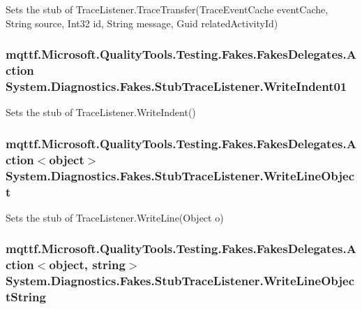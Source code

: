Sets the stub of Trace\-Listener.\-Trace\-Transfer(\-Trace\-Event\-Cache event\-Cache, String source, Int32 id, String message, Guid related\-Activity\-Id)

\hypertarget{class_system_1_1_diagnostics_1_1_fakes_1_1_stub_trace_listener_aa9d5761767a2ecc60a3db129716130dd}{
\subsubsection[{Write\-Indent01}]{\setlength{\rightskip}{0pt plus 5cm}mqttf.\-Microsoft.\-Quality\-Tools.\-Testing.\-Fakes.\-Fakes\-Delegates.\-Action System.\-Diagnostics.\-Fakes.\-Stub\-Trace\-Listener.\-Write\-Indent01}}\label{class_system_1_1_diagnostics_1_1_fakes_1_1_stub_trace_listener_aa9d5761767a2ecc60a3db129716130dd}


Sets the stub of Trace\-Listener.\-Write\-Indent()

\hypertarget{class_system_1_1_diagnostics_1_1_fakes_1_1_stub_trace_listener_a69bf38a6fcd21de1b4cc9af632e6d5ff}{
\subsubsection[{Write\-Line\-Object}]{\setlength{\rightskip}{0pt plus 5cm}mqttf.\-Microsoft.\-Quality\-Tools.\-Testing.\-Fakes.\-Fakes\-Delegates.\-Action$<$object$>$ System.\-Diagnostics.\-Fakes.\-Stub\-Trace\-Listener.\-Write\-Line\-Object}}\label{class_system_1_1_diagnostics_1_1_fakes_1_1_stub_trace_listener_a69bf38a6fcd21de1b4cc9af632e6d5ff}


Sets the stub of Trace\-Listener.\-Write\-Line(\-Object o)

\hypertarget{class_system_1_1_diagnostics_1_1_fakes_1_1_stub_trace_listener_a155261d1acef8b8b5f24e3be80c1d46a}{
\subsubsection[{Write\-Line\-Object\-String}]{\setlength{\rightskip}{0pt plus 5cm}mqttf.\-Microsoft.\-Quality\-Tools.\-Testing.\-Fakes.\-Fakes\-Delegates.\-Action$<$object, string$>$ System.\-Diagnostics.\-Fakes.\-Stub\-Trace\-Listener.\-Write\-Line\-Object\-String}}\label{class_system_1_1_diagnostics_1_1_fakes_1_1_stub_trace_listener_a155261d1acef8b8b5f24e3be80c1d46a}


